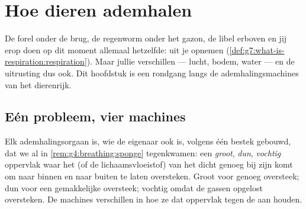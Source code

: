 \chapter{Hoe dieren ademhalen}\label{ch:g7:how-animals-breathe}

De forel onder de brug, de regenworm onder het gazon, de libel erboven en
jij erop doen op dit moment allemaal hetzelfde:  uit je 
opnemen (\cref{def:g7:what-is-respiration:respiration}). Maar jullie
 verschillen --- lucht, bodem, water --- en de uitrusting dus
ook. Dit hoofdstuk is een rondgang langs de ademhalingsmachines van het
dierenrijk.

\section{Eén probleem, vier machines}

\begin{proposition}\label{prop:g7:how-animals-breathe:spec}
Elk ademhalingsorgaan is, wie de eigenaar ook is, volgens één bestek
gebouwd, dat we al in \cref{rem:g4:breathing:sponge} tegenkwamen: een
\emph{groot}, \emph{dun}, \emph{vochtig} oppervlak waar het  (of de
lichaamsvloeistof) van het  dicht genoeg bij zijn  komt om
 naar binnen en  naar buiten te laten oversteken.
Groot voor genoeg oversteek; dun voor een gemakkelijke oversteek; vochtig
omdat de gassen opgelost oversteken. De machines verschillen in hoe ze
dat oppervlak tegen de  aan houden.
\end{proposition}
\admitted

